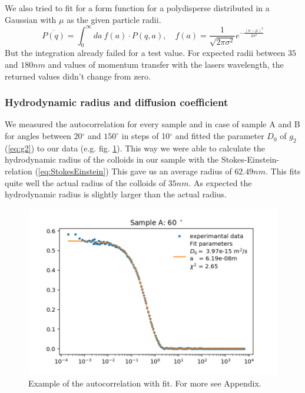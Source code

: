 \documentclass[]{article}
\begin{document}
We also tried to fit for a form function for a polydisperse distributed in a Gaussian with $\mu$ as the given particle radii. 
\[ \overline{P(q)} = \int_0^\infty da\: f(a)\cdot P(q,a) , \quad f(a)= \frac{1}{\sqrt{2 \pi \sigma^2}} e^{-\frac{(a-\mu)^2}{2 \sigma^2}} \]
But the integration already failed for a test value. For expected radii between $35$ and $180nm$ and values of momentum transfer with the lasers wavelength, the returned values didn't change from zero. 

\subsubsection{Hydrodynamic radius and diffusion coefficient}
We measured the autocorrelation for every sample and in case of sample A and B for angles between 20$^\circ$ and $150^\circ$ in steps of 10$^\circ$ and fitted the parameter $D_0$ of $g_2$ (\ref{eq:g2}) to our data (e.g. fig.  \ref{fig:Sample A 60}). This way we were able to calculate the hydrodynamic radius of the colloids in our sample with the Stokes-Einstein-relation (\ref{eq:StokesEinstein}) This gave us an average radius of $62.49 nm$. This fits quite well the actual radius of the colloids of $35nm$. As expected the  hydrodynamic radius is slightly larger than the actual radius. 



\begin{figure}
	\centering
	\includegraphics[width=0.7\linewidth]{Plots/A/60}
	\caption[Autocorrelation with fit of $g_2$]{}
	\caption{Example of the autocorrelation with fit. For more see Appendix.}
	\label{fig:Sample A 60}
\end{figure}
\end{document}
